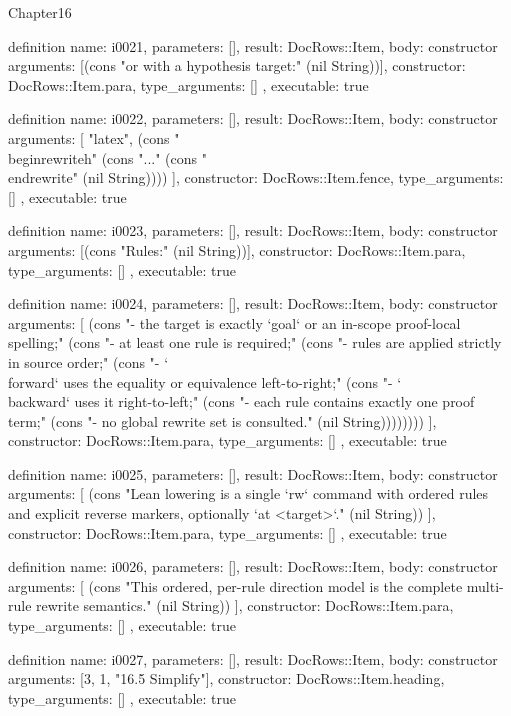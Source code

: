 \begin{lexlean}{Chapter16}
\begin{semanticmodule}
definition{
  name: i0021,
  parameters: [],
  result: DocRows::Item,
  body: constructor{
    arguments: [(cons "or with a hypothesis target:" (nil String))],
    constructor: DocRows::Item.para,
    type_arguments: []
  },
  executable: true
}

definition{
  name: i0022,
  parameters: [],
  result: DocRows::Item,
  body: constructor{
    arguments: [
      "latex",
      (cons "\\begin{rewrite}{h}" (cons "..." (cons "\\end{rewrite}" (nil String))))
    ],
    constructor: DocRows::Item.fence,
    type_arguments: []
  },
  executable: true
}

definition{
  name: i0023,
  parameters: [],
  result: DocRows::Item,
  body: constructor{
    arguments: [(cons "Rules:" (nil String))],
    constructor: DocRows::Item.para,
    type_arguments: []
  },
  executable: true
}

definition{
  name: i0024,
  parameters: [],
  result: DocRows::Item,
  body: constructor{
    arguments: [
      (cons "- the target is exactly `goal` or an in-scope proof-local spelling;" (cons "- at least one rule is required;" (cons "- rules are applied strictly in source order;" (cons "- `\\forward` uses the equality or equivalence left-to-right;" (cons "- `\\backward` uses it right-to-left;" (cons "- each rule contains exactly one proof term;" (cons "- no global rewrite set is consulted." (nil String))))))))
    ],
    constructor: DocRows::Item.para,
    type_arguments: []
  },
  executable: true
}

definition{
  name: i0025,
  parameters: [],
  result: DocRows::Item,
  body: constructor{
    arguments: [
      (cons "Lean lowering is a single `rw` command with ordered rules and explicit reverse markers, optionally `at <target>`." (nil String))
    ],
    constructor: DocRows::Item.para,
    type_arguments: []
  },
  executable: true
}

definition{
  name: i0026,
  parameters: [],
  result: DocRows::Item,
  body: constructor{
    arguments: [
      (cons "This ordered, per-rule direction model is the complete multi-rule rewrite semantics." (nil String))
    ],
    constructor: DocRows::Item.para,
    type_arguments: []
  },
  executable: true
}

definition{
  name: i0027,
  parameters: [],
  result: DocRows::Item,
  body: constructor{
    arguments: [3, 1, "16.5 Simplify"],
    constructor: DocRows::Item.heading,
    type_arguments: []
  },
  executable: true
}


\end{semanticmodule}
\end{lexlean}
